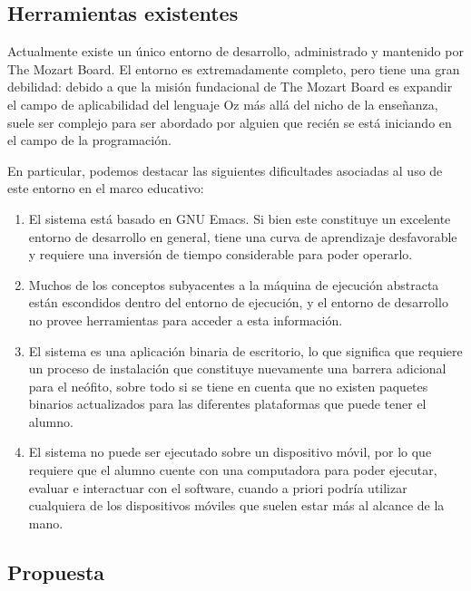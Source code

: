 \documentclass[a4paper,11pt]{article}
\begin{document}
\subsection{Herramientas existentes}

Actualmente existe un único entorno de desarrollo, administrado y mantenido por
The Mozart Board. El entorno es extremadamente completo, pero tiene una gran
debilidad: debido a que la misión fundacional de The Mozart Board es expandir
el campo de aplicabilidad del lenguaje Oz más allá del nicho de la enseñanza,
suele ser complejo para ser abordado por alguien que recién se está iniciando
en el campo de la programación.

En particular, podemos destacar las siguientes dificultades asociadas al uso de
este entorno en el marco educativo:

\begin{enumerate}

  \item El sistema está basado en GNU Emacs. Si bien este constituye un excelente
    entorno de desarrollo en general, tiene una curva de aprendizaje desfavorable y
    requiere una inversión de tiempo considerable para poder operarlo.

  \item Muchos de los conceptos subyacentes a la máquina de ejecución abstracta
    están escondidos dentro del entorno de ejecución, y el entorno de desarrollo
    no provee herramientas para acceder a esta información.

  \item El sistema es una aplicación binaria de escritorio, lo que significa que
    requiere un proceso de instalación que constituye nuevamente una barrera
    adicional para el neófito, sobre todo si se tiene en cuenta que no existen
    paquetes binarios actualizados para las diferentes plataformas que puede
    tener el alumno.

  \item El sistema no puede ser ejecutado sobre un dispositivo móvil, por lo que
    requiere que el alumno cuente con una computadora para poder ejecutar,
    evaluar e interactuar con el software, cuando a priori podría utilizar
    cualquiera de los dispositivos móviles que suelen estar más al alcance de la
    mano.

\end{enumerate}

\subsection{Propuesta}
\end{document}
